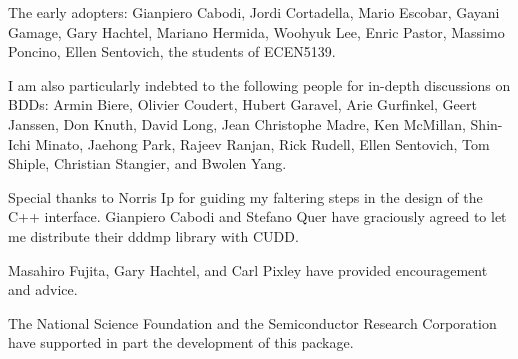\documentclass[11pt]{article}
\begin{document}
\noindent
The early adopters: Gianpiero Cabodi, Jordi Cortadella, Mario Escobar,
Gayani Gamage, Gary Hachtel, Mariano Hermida, Woohyuk Lee, Enric
Pastor, Massimo Poncino, Ellen Sentovich, the students of ECEN5139.

I am also particularly indebted to the following people for in-depth
discussions on BDDs: Armin Biere, Olivier Coudert, Hubert Garavel,
Arie Gurfinkel, Geert Janssen, Don Knuth, David Long, Jean Christophe
Madre, Ken McMillan, Shin-Ichi Minato, Jaehong Park, Rajeev Ranjan,
Rick Rudell, Ellen Sentovich, Tom Shiple, Christian Stangier, and
Bwolen Yang.

Special thanks to Norris Ip for guiding my faltering steps
in the design of the C++ interface.
Gianpiero Cabodi and Stefano Quer have graciously agreed to let me
distribute their dddmp library with CUDD.

Masahiro Fujita, Gary Hachtel, and Carl Pixley have provided
encouragement and advice.

The National Science Foundation and the Semiconductor Research
Corporation have supported in part the development of this package.

{}
%
\end{document}
